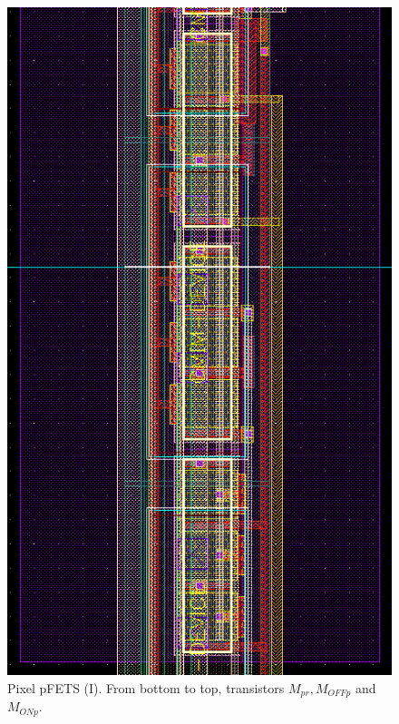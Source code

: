 \begin{figure}
    \center
    \includegraphics{pixel2.png}
    \caption{Pixel pFETS (I). From bottom to top, transistors $M_{pr}, M_{OFFp}$ and $M_{ONp}$.}
    \label{dos}
\end{figure}

